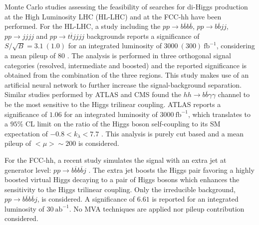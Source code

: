 Monte Carlo studies assessing the feasibility of searches for di-Higgs production at the High Luminosity LHC (HL-LHC) and at the FCC-hh have been performed. For the HL-LHC, a study including the $pp\rightarrow b\overline{b}b\overline{b}$, $pp\rightarrow b\overline{b}jj$, $pp\rightarrow jjjj$ and $pp\rightarrow t\overline{t}jjjj$ backgrounds reports a significance of $S/\sqrt{B}=3.1~(1.0)$ for an integrated luminosity of $3000~(300)~\text{fb}^{-1}$, considering a mean pileup of $80$ \cite{hhFeasibility}. The analysis is performed in three orthogonal signal categories (resolved, intermediate and boosted) and the reported significance is obtained from the combination of the three regions. This study makes use of an artificial neural network to further increase the signal-background separation. Similar studies performed by ATLAS and CMS found the $hh\rightarrow b\overline{b}\gamma\gamma$ channel to be the most sensitive to the Higgs trilinear coupling. ATLAS reports a significance of $1.06$ for an integrated luminosity of $3000~\text{fb}^{-1}$, which translates to a $95\%$ CL limit on the ratio of the Higgs boson self-coupling to its SM expectation of $-0.8<k_{\lambda}<7.7$ \cite{ATLAShh2bbAA_HL}. This analysis is purely cut based and a mean pileup of $<\mu>\sim 200$ is considered. 

For the FCC-hh, a recent study simulates the signal with an extra jet at generator level: $pp\rightarrow b\overline{b}b\overline{b}j$ \cite{hh+jet_100TeV}. The extra jet boosts the Higgs pair favoring a highly boosted virtual Higgs decaying to a pair of Higgs bosons which enhances the sensitivity to the Higgs trilinear coupling. Only the irreducible background, $pp\rightarrow b\overline{b}b\overline{b}j$, is considered. A significance of $6.61$ is reported for an integrated luminosity of $30~\text{ab}^{-1}$. No MVA techniques are applied nor pileup contribution considered.

